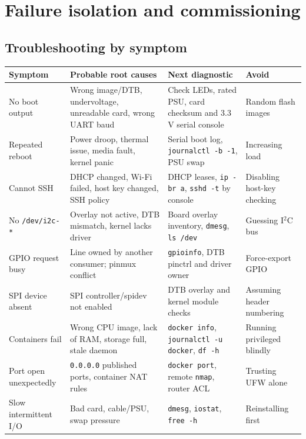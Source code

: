 \documentclass[10pt,oneside,openany]{report}
\newcommand{\code}[1]{\texttt{#1}}
\begin{document}
\chapter{Failure isolation and commissioning}
\section{Troubleshooting by symptom}
\begin{center}\small\begin{longtable}{@{}>{\raggedright\arraybackslash}p{2.55cm}>{\raggedright\arraybackslash}p{4.5cm}>{\raggedright\arraybackslash}p{4.25cm}>{\raggedright\arraybackslash}p{2.6cm}@{}}\toprule
\textbf{Symptom} & \textbf{Probable root causes} & \textbf{Next diagnostic} & \textbf{Avoid}\\\midrule\endhead
No boot output & Wrong image/DTB, undervoltage, unreadable card, wrong UART baud & Check LEDs, rated PSU, card checksum and 3.3\,V serial console & Random flash images\\
Repeated reboot & Power droop, thermal issue, media fault, kernel panic & Serial boot log, \code{journalctl -b -1}, PSU swap & Increasing load\\
Cannot SSH & DHCP changed, Wi-Fi failed, host key changed, SSH policy & DHCP leases, \code{ip -br a}, \code{sshd -t} by console & Disabling host-key checking\\
No \code{/dev/i2c-*} & Overlay not active, DTB mismatch, kernel lacks driver & Board overlay inventory, \code{dmesg}, \code{ls /dev} & Guessing I\(^{2}\)C bus\\
GPIO request busy & Line owned by another consumer; pinmux conflict & \code{gpioinfo}, DTB pinctrl and driver owner & Force-export GPIO\\
SPI device absent & SPI controller/spidev not enabled & DTB overlay and kernel module checks & Assuming header numbering\\
Containers fail & Wrong CPU image, lack of RAM, storage full, stale daemon & \code{docker info}, \code{journalctl -u docker}, \code{df -h} & Running privileged blindly\\
Port open unexpectedly & \code{0.0.0.0} published ports, container NAT rules & \code{docker port}, remote \code{nmap}, router ACL & Trusting UFW alone\\
Slow intermittent I/O & Bad card, cable/PSU, swap pressure & \code{dmesg}, \code{iostat}, \code{free -h} & Reinstalling first\\
\bottomrule\end{longtable}\end{center}
\end{document}
